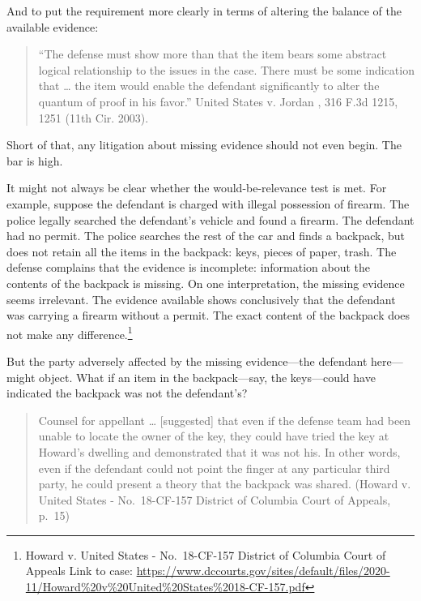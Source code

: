 \documentclass[
  10pt,
  dvipsnames,enabledeprecatedfontcommands]{scrartcl}
\begin{document}
\noindent And to put the requirement more clearly in terms of altering
the balance of the available evidence:

\begin{quote}
``The defense must show more than that the item bears some abstract
logical relationship to the issues in the case. There must be some
indication that \ldots{} the item would enable the defendant
significantly to alter the quantum of proof in his favor.'' United
States v. Jordan , 316 F.3d 1215, 1251 (11th Cir. 2003).
\end{quote}

\noindent Short of that, any litigation about missing evidence should
not even begin. The bar is high.

It might not always be clear whether the would-be-relevance test is met.
For example, suppose the defendant is charged with illegal possession of
firearm. The police legally searched the defendant's vehicle and found a
firearm. The defendant had no permit. The police searches the rest of
the car and finds a backpack, but does not retain all the items in the
backpack: keys, pieces of paper, trash. The defense complains that the
evidence is incomplete: information about the contents of the backpack
is missing. On one interpretation, the missing evidence seems
irrelevant. The evidence available shows conclusively that the defendant
was carrying a firearm without a permit. The exact content of the
backpack does not make any difference.\footnote{Howard v. United States
  - No.~18-CF-157 District of Columbia Court of Appeals Link to case:
  \url{https://www.dccourts.gov/sites/default/files/2020-11/Howard\%20v\%20United\%20States\%2018-CF-157.pdf}}

But the party adversely affected by the missing evidence---the defendant
here---might object. What if an item in the backpack---say, the
keys---could have indicated the backpack was not the defendant's?

\begin{quote}
Counsel for appellant \ldots{} {[}suggested{]} that even if the defense
team had been unable to locate the owner of the key, they could have
tried the key at Howard's dwelling and demonstrated that it was not his.
In other words, even if the defendant could not point the finger at any
particular third party, he could present a theory that the backpack was
shared. (Howard v. United States - No.~18-CF-157 District of Columbia
Court of Appeals, p.~15)
\end{quote}
\end{document}
